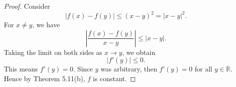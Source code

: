 \begin{Exercise}
\begin{proof}
Consider
$$
|f(x)-f(y)| \leq (x-y)^2 = |x-y|^2.
$$
For $x\neq y$, we have
$$
\left| \frac{f(x)-f(y)}{x-y} \right| \leq |x-y|.
$$
Taking the limit on both sides as $x\to y$, we obtain
$$
|f'(y)| \leq 0.
$$
This means $f'(y) = 0$. Since $y$ was arbitrary, then $f'(y) = 0$ for all $y\in\mathbb{R}$. Hence by Theorem 5.11(b), $f$ is constant.
\end{proof}
\end{Exercise}